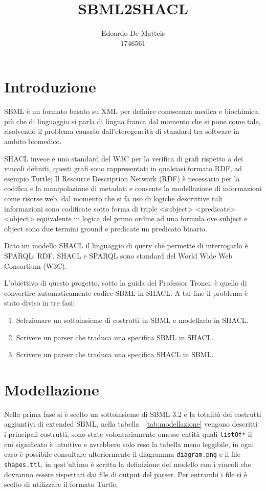 \documentclass{article}
\title{SBML2SHACL}
\author{Edoardo De Matteis \\ 1746561}
\begin{document}
\maketitle
\tableofcontents

\section{Introduzione}
SBML è un formato basato su XML per definire conoscenza medica e biochimica, più che di linguaggio si parla di lingua franca dal momento che si pone come tale, risolvendo il problema causato dall'eterogeneità di standard tra software in ambito biomedico. 

SHACL invece è uno standard del W3C per la verifica di grafi rispetto a dei vincoli definiti, questi grafi sono rappresentati in qualsiasi formato RDF, ad esempio Turtle; Il Resource Description Network (RDF) è necessario per la codifica e la manipolazione di metadati e consente la modellazione di informazioni come risorse web, dal momento che si fa uso di logiche descrittive tali informazioni sono codificate sotto forma di triple <subject> <predicate> <object> equivalente in logica del primo ordine ad una formula ove subject e object sono due termini ground e predicate un predicato binario. 

Dato un modello SHACL il linguaggio di query che permette di interrogarlo è SPARQL; RDF, SHACL e SPARQL sono standard del World Wide Web Consortium (W3C). 

L'obiettivo di questo progetto, sotto la guida del Professor Tronci, è quello di convertire automaticamente codice SBML in SHACL. A tal fine il problema è stato diviso in tre fasi:

\begin{enumerate}
    \item Selezionare un sottoinsieme di costrutti in SBML e modellarlo in SHACL. 
    \item Scrivere un parser che traduca una specifica SBML in SHACL.
    \item Scrivere un parser che traduca una specifica SHACL in SBML.
\end{enumerate}

\section{Modellazione}

Nella prima fase si è scelto un sottoinsieme di SBML 3.2 e la totalità dei costrutti aggiuntivi di extended SBML, nella tabella ~\ref{tab:modellazione} vengono descritti i principali costrutti, sono state volontariamente omesse entità quali \texttt{listOf*} il cui significato è intuitivo e avrebbero solo reso la tabella meno leggibile, in ogni caso è possibile consultare ulteriormente il diagramma \texttt{diagram.png} e il file \texttt{shapes.ttl}, in qest'ultimo è scritta la definizione del modello con i vincoli che dovranno essere rispettati dai file di output del parser. Per entrambi i file si è scelto di utilizzare il formato Turtle. 
\end{document}
